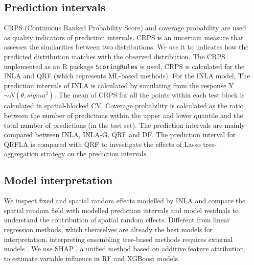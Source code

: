 \documentclass{article}
\begin{document}
\subsection {Prediction intervals}
CRPS (Continuous Ranked Probability Score) and coverage probability are used as quality indicators of prediction intervals. CRPS is an uncertain measure that assesses the similarities between two distributions.  We use it to indicates how the predicted distribution matches with the observed distribution. The CRPS implemented as an R package {\tt ScoringRules} \citep{jordan2017evaluating} is used. CRPS is calculated for the INLA and QRF (which represents ML-based methods). For the INLA model, The prediction intervals of INLA is calculated by simulating from the response Y $\sim N(\theta, sigma^2)$. The mean of CRPS for all the points within each test block is calculated in spatial-blocked CV. Coverage probability is calculated as the ratio between the number of predictions within the upper and lower quantile and the total number of predictions (in the test set). The prediction intervals are mainly compared between INLA, INLA-G, QRF and DF. The prediction interval for QRFLA is compared with QRF to investigate the effects of Lasso tree-aggregation strategy on the prediction intervals.
 
 
\subsection{Model interpretation}
We inspect fixed and spatial random effects modelled by INLA and compare the spatial random field with modelled prediction intervals and model residuals to understand the contribution of spatial random effects. Different from linear regression methods, which themselves are already the best models for interpretation, interpreting ensembling tree-based methods requires external models \citep{NIPS2017_8a20a862}. We use SHAP \citep[SHapley Additive exPlanations,][]{lundberg2018explainable,NIPS2017_8a20a862}, a unified method based on additive feature attribution, to estimate variable influence in RF and XGBoost models.   


\end{document}
